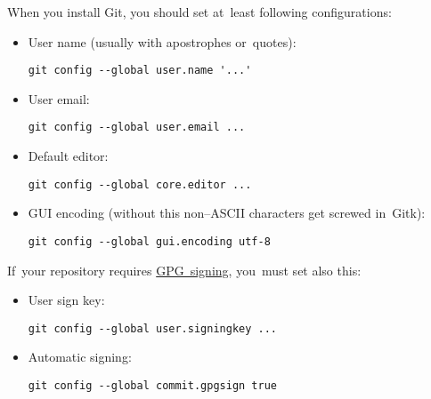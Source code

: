 \label{gitbasicconfiguration}
When you install Git, you should set at~least following configurations:
\begin{itemize}
    \item User name (usually with apostrophes or~quotes):
\begin{lstlisting}[frame=no, gobble=12]
            git config --global user.name '...'
        \end{lstlisting}
    \item User email:
\begin{lstlisting}[frame=no, gobble=12]
            git config --global user.email ...
        \end{lstlisting}
    \item Default editor:
\begin{lstlisting}[frame=no, gobble=12]
            git config --global core.editor ...
        \end{lstlisting}
    \item GUI encoding (without this non--ASCII characters get screwed in~Gitk):
\begin{lstlisting}[frame=no, gobble=12]
            git config --global gui.encoding utf-8
        \end{lstlisting}
\end{itemize}
\noindent If~your repository requires \hyperref[gitgpg]{GPG~signing}, you~must set also this:
\begin{itemize}
    \item User sign key:
\begin{lstlisting}[frame=no, gobble=12]
            git config --global user.signingkey ...
        \end{lstlisting}
    \item Automatic signing:
\begin{lstlisting}[frame=no, gobble=12]
            git config --global commit.gpgsign true
        \end{lstlisting}
\end{itemize}
